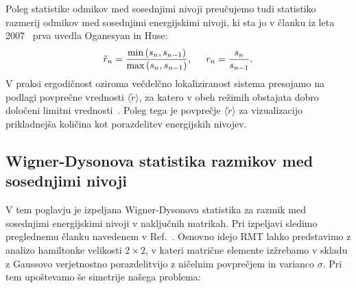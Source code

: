  Poleg statistike odmikov med sosednjimi nivoji 
 preučujemo tudi statistiko razmerij odmikov med sosednjimi energijskimi nivoji, ki sta jo v članku iz leta 2007~\cite{PhysRevB.75.155111} prva uvedla Oganesyan in Huse:
 \begin{equation}\label{eq:oganesyan_huse}
 \tilde{r}_n=\frac{\min\left(s_n,s_{n-1}\right)}{\max\left(s_n,s_{n-1}\right)}, \hspace{5mm} r_n=\frac{s_n}{s_{n-1}}.
 \end{equation}
 V praksi ergodičnost oziroma večdelčno lokaliziranost sistema presojamo na podlagi povprečne vrednosti $\langle \tilde{r}\rangle$, za katero v obeh režimih obstajata dobro določeni limitni vrednosti~\cite{atas2013distribution}. Poleg tega je povprečje $\langle \tilde{r}\rangle$ za vizualizacijo prikladnejša količina kot porazdelitev energijskih nivojev. 
 \subsection{Wigner-Dysonova statistika razmikov med sosednjimi nivoji} 
 V tem poglavju je izpeljana Wigner-Dysonova statistika za razmik med sosednjimi energijskimi nivoji v naključnih matrikah. Pri izpeljavi sledimo preglednemu članku navedenem v Ref.~\cite{d2016quantum}.
 Osnovno idejo RMT lahko predstavimo z analizo hamiltonke velikosti $2\times2$, v kateri matrične elemente izžrebamo v skladu z Gaussovo verjetnostno porazdelitvijo z ničelnim povprečjem in varianco $\sigma$.  Pri tem upoštevamo še simetrije našega problema:

